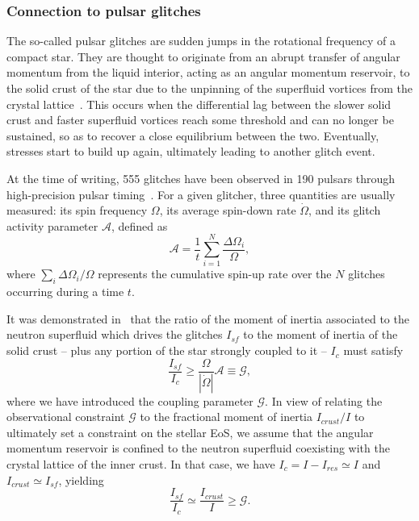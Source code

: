 \subsubsection{Connection to pulsar glitches}\label{subsubsec:glitch}

The so-called pulsar glitches are sudden jumps in the rotational frequency of 
a compact star. They are thought to originate from an abrupt transfer of 
angular momentum from the liquid interior, acting as an angular momentum
reservoir, to the solid crust of the star due to the unpinning of the 
superfluid vortices from the crystal lattice~\cite{Anderson1975}. This occurs 
when the differential lag between the slower solid crust and faster superfluid 
vortices reach some threshold and can no longer be sustained, so as to recover 
a close equilibrium between the two. Eventually, stresses start to build up 
again, ultimately leading to another glitch event.

At the time of writing, 555 glitches have been observed in 190 pulsars through 
high-precision pulsar timing~\cite{Espinoza2011,Glitches}. For a given 
glitcher, three quantities are usually measured: its spin frequency $\Omega$, 
its average spin-down rate $\dot{\Omega}$, and its glitch activity parameter
$\mathcal{A}$, defined as
%
\begin{equation}
  \mathcal{A} = \frac{1}{t}\sum_{i=1}^{N} \frac{\Delta \Omega_i}{\Omega},
\end{equation}
%
where $\sum_i \Delta\Omega_i/\Omega$ represents the cumulative spin-up rate
over the $N$ glitches occurring during a time $t$.

It was demonstrated in~\cite{Link1999} that the ratio of the moment of inertia
associated to the neutron superfluid which drives the glitches $I_{sf}$ to the 
moment of inertia of the solid crust -- plus any portion of the star strongly 
coupled to it -- $I_c$ must satisfy 
%
\begin{equation}
  \frac{I_{sf}}{I_c} \geq \frac{\Omega}{|\dot{\Omega}|}\mathcal{A} 
  \equiv \mathcal{G},
\end{equation}
%
where we have introduced the coupling parameter $\mathcal{G}$. In view of
relating the observational constraint $\mathcal{G}$ to the fractional moment of
inertia $I_{crust}/I$ to ultimately set a constraint on the stellar EoS, we 
assume that the angular momentum reservoir is confined to the neutron 
superfluid coexisting with the crystal lattice of the inner crust. In that 
case, we have $I_c = I - I_{res} \simeq I$ and $I_{crust} \simeq I_{sf}$,
yielding~\cite{Link1999}
%
\begin{equation}
  \frac{I_{sf}}{I_c} \simeq \frac{I_{crust}}{I} 
  \geq \mathcal{G}\label{eq:noent}.
\end{equation}
%

